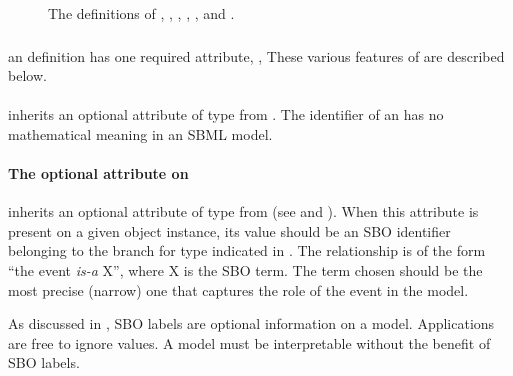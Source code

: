 \begin{figure}[htb]
  \vspace*{-1ex}
  \caption{The definitions of \Event, \Trigger, \Delay, \Priority,
    \EventAssignment, and \ListOfEventAssignments.}
  \label{fig:event}
\end{figure}


\subsubsection{}

an \Event definition has one required attribute, , 
These various features of \Event are described below.


\paragraph{}
\label{sec:event-id-name}

{\Event inherits an optional  attribute of type  from \SBase.  The identifier of an \Event has no mathematical meaning in an SBML \thisLV model.}


\paragraph{The optional  attribute on }
\label{sec:event-sboterm}

\Event inherits an optional  attribute of type
 from \SBase (see
 and ).  When this
attribute is present on a given \Event object instance, its value
should be an SBO identifier belonging to the branch for type
\Event indicated in .  The
relationship is of the form ``the event \emph{is-a} X'', where X
is the SBO term.  The term chosen should be the most precise
(narrow) one that captures the role of the event in the model.

As discussed in , SBO labels are optional
information on a model.  Applications are free to ignore
 values.  A model must be interpretable without the
benefit of SBO labels.


